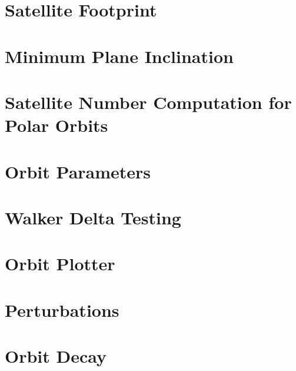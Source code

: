 
\section{Satellite Footprint}
\label{SatFootprint}


\section{Minimum Plane Inclination}
\label{MinimumInclination}


\section{Satellite Number Computation for Polar Orbits}
\label{SatNumberPolar}


\section{Orbit Parameters}
\label{OrbitParameters}




\section{Walker Delta Testing}
\label{smartWD}


\section{Orbit Plotter}
\label{OrbitPlotter}






\section{Perturbations}
\label{Perturbation}



\section{Orbit Decay}
\label{OrbitDecay}



